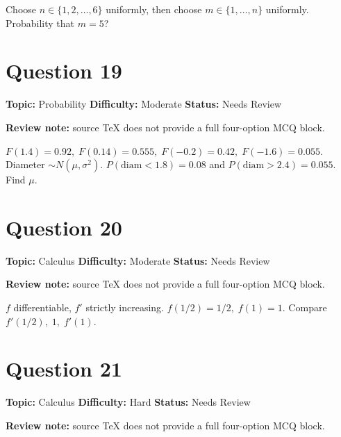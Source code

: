 \documentclass[11pt]{article}
\begin{document}
Choose $n\in\{1,2,\dots,6\}$ uniformly, then choose $m\in\{1,\dots,n\}$ uniformly. Probability that $m=5$?

\newpage

\section*{Question 19}


\noindent\textbf{Topic:} Probability \quad \textbf{Difficulty:} Moderate \quad \textbf{Status:} Needs Review

\par\noindent\textcolor{StatAmber}{\textbf{Review note:} source TeX does not provide a full four-option MCQ block.}


$F(1.4)=0.92,\;F(0.14)=0.555,\;F(-0.2)=0.42,\;F(-1.6)=0.055$. Diameter $\sim N(\mu,\sigma^2)$. $P(\text{diam}<1.8)=0.08$ and $P(\text{diam}>2.4)=0.055$. Find $\mu$.

\newpage

\section*{Question 20}


\noindent\textbf{Topic:} Calculus \quad \textbf{Difficulty:} Moderate \quad \textbf{Status:} Needs Review

\par\noindent\textcolor{StatAmber}{\textbf{Review note:} source TeX does not provide a full four-option MCQ block.}


$f$ differentiable, $f'$ strictly increasing. $f(1/2)=1/2,\;f(1)=1$. Compare $f'(1/2),\;1,\;f'(1)$.

\newpage

\section*{Question 21}


\noindent\textbf{Topic:} Calculus \quad \textbf{Difficulty:} Hard \quad \textbf{Status:} Needs Review

\par\noindent\textcolor{StatAmber}{\textbf{Review note:} source TeX does not provide a full four-option MCQ block.}
\end{document}
